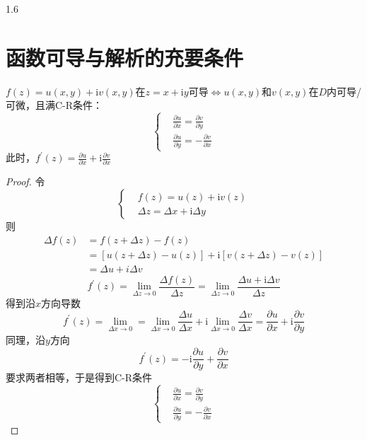 \documentclass[lang=cn,10pt]{elegantbook}
\renewcommand{\i}{\mathrm{i}}
\begin{document}
\begin{spacing}{1.6}
\section{函数可导与解析的充要条件}
$f\left(z\right)=u\left(x,y\right)+\i v\left(x,y\right)$在$z=x+\i y$可导$\Longleftrightarrow u\left(x,y\right)$和$v\left(x,y\right)$在$D$内可导/可微，且满C-R条件：
$$
\left\{
\begin{aligned}
&\frac{\partial u}{\partial x}=\frac{\partial v}{\partial y}\\
&\frac{\partial u}{\partial y}=-\frac{\partial v}{\partial x}
\end{aligned}
\right.
$$
此时，$f^{\prime}\left(z\right)=\frac{\partial u}{\partial x}+\i\frac{\partial v}{\partial x}$
\begin{proof}
令
$$
\left\{
\begin{aligned}
&f\left(z\right)=u\left(z\right)+\i v\left(z\right)\\
&\Delta z=\Delta x+\i\Delta y
\end{aligned}
\right.
$$
则
$$
\begin{aligned}
\Delta f\left(z\right)&=f\left(z+\Delta z\right)-f\left(z\right)\\
&=\left[u\left(z+\Delta z\right)-u\left(z\right)\right]+\i\left[v\left(z+\Delta z\right)-v\left(z\right)\right]\\
&=\Delta u+i\Delta v
\end{aligned}
$$
$$f^{\prime}\left(z\right)=\lim_{\Delta z\to 0}\frac{\Delta f\left(z\right)}{\Delta z}=\lim_{\Delta z\to 0}\frac{\Delta u+\i\Delta v}{\Delta z}$$
得到沿$x$方向导数
$$f^{\prime}\left(z\right)=\lim_{\Delta x\to 0}=\lim_{\Delta x\to 0}\frac{\Delta u}{\Delta x}+\i\lim_{\Delta x\to 0}\frac{\Delta v}{\Delta x}=\frac{\partial u}{\partial x}+\i\frac{\partial v}{\partial y}$$
同理，沿$y$方向
$$f^{\prime}\left(z\right)=-\i\frac{\partial u}{\partial y}+\frac{\partial v}{\partial x}$$
要求两者相等，于是得到C-R条件
$$
\left\{
\begin{aligned}
&\frac{\partial u}{\partial x}=\frac{\partial v}{\partial y}\\
&\frac{\partial u}{\partial y}=-\frac{\partial v}{\partial x}
\end{aligned}
\right.
$$
\end{proof}

\end{spacing}
\end{document}
